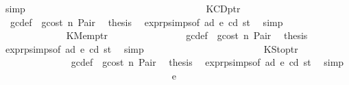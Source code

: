 \begin{isabellebody}
\ simp\isanewline
\ \ \ \ \ \ \ \ \ \ \ \ \isamarkupfalse%
\isanewline
\ \ \ \ \ \ \ \ \ \ \isamarkupfalse%
\isanewline
\ \ \ \ \ \ \ \ \ \ \ \ \isamarkupfalse%
\ {\isacharparenleft}{\kern0pt}KCDptr\ {\isacharunderscore}{\kern0pt}{\isacharparenright}{\kern0pt}\isanewline
\ \ \ \ \ \ \ \ \ \ \ \ \isamarkupfalse%
\ {}{}\ gc{\isacharunderscore}{\kern0pt}def\ {\isacharasterisk}{\kern0pt}\ gcost\ n\ Pair\ \isamarkupfalse%
\ {\isacharquery}{\kern0pt}thesis\ \isamarkupfalse%
\ expr{\isachardot}{\kern0pt}psimps{\isacharparenleft}{\kern0pt}{}{\isacharparenright}{\kern0pt}{\isacharbrackleft}{\kern0pt}of\ ad\ e\ cd\ st{\isacharbrackright}{\kern0pt}\ \isamarkupfalse%
\ simp\isanewline
\ \ \ \ \ \ \ \ \ \ \isamarkupfalse%
\isanewline
\ \ \ \ \ \ \ \ \ \ \ \ \isamarkupfalse%
\ {\isacharparenleft}{\kern0pt}KMemptr\ {\isacharunderscore}{\kern0pt}{\isacharparenright}{\kern0pt}\isanewline
\ \ \ \ \ \ \ \ \ \ \ \ \isamarkupfalse%
\ {}{}\ gc{\isacharunderscore}{\kern0pt}def\ {\isacharasterisk}{\kern0pt}\ gcost\ n\ Pair\ \isamarkupfalse%
\ {\isacharquery}{\kern0pt}thesis\ \isamarkupfalse%
\ expr{\isachardot}{\kern0pt}psimps{\isacharparenleft}{\kern0pt}{}{\isacharparenright}{\kern0pt}{\isacharbrackleft}{\kern0pt}of\ ad\ e\ cd\ st{\isacharbrackright}{\kern0pt}\ \isamarkupfalse%
\ simp\isanewline
\ \ \ \ \ \ \ \ \ \ \isamarkupfalse%
\isanewline
\ \ \ \ \ \ \ \ \ \ \ \ \isamarkupfalse%
\ {\isacharparenleft}{\kern0pt}KStoptr\ {\isacharunderscore}{\kern0pt}{\isacharparenright}{\kern0pt}\isanewline
\ \ \ \ \ \ \ \ \ \ \ \ \isamarkupfalse%
\ {}{}\ gc{\isacharunderscore}{\kern0pt}def\ {\isacharasterisk}{\kern0pt}\ gcost\ n\ Pair\ \isamarkupfalse%
\ {\isacharquery}{\kern0pt}thesis\ \isamarkupfalse%
\ expr{\isachardot}{\kern0pt}psimps{\isacharparenleft}{\kern0pt}{}{\isacharparenright}{\kern0pt}{\isacharbrackleft}{\kern0pt}of\ ad\ e\ cd\ st{\isacharbrackright}{\kern0pt}\ \isamarkupfalse%
\ simp\isanewline
\ \ \ \ \ \ \ \ \ \ \isamarkupfalse%
\isanewline
\ \ \ \ \ \ \ \ \isamarkupfalse%
\isanewline
\ \ \ \ \ \ \isamarkupfalse%
\isanewline
\ \ \ \ \ \ \ \ \isamarkupfalse%
\ {\isacharparenleft}{\kern0pt}e\ {\isacharunderscore}{\kern0pt}{\isacharparenright}{\kern0pt}\isanewline

\end{isabellebody}
